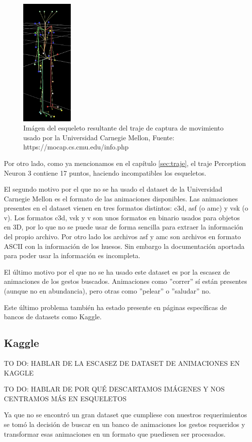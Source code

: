 \begin{figure}[H]
    \centering
    \includegraphics[width=0.23\textwidth]{Imagenes/Bitmap/MCUEsqueleto.jpg}
    \caption{Imágen del esqueleto resultante del traje de captura de movimiento usado por la Universidad Carnegie Mellon, Fuente: https://mocap.cs.cmu.edu/info.php}
    \label{fig:MCUEsqueleto}
\end{figure}

Por otro lado, como ya mencionamos en el capítulo \ref{sec:traje}, el traje Perception Neuron 3 contiene 17 puntos, haciendo incompatibles los esqueletos.

El segundo motivo por el que no se ha usado el dataset de la Universidad Carnegie Mellon es el formato de las animaciones disponibles.
Las animaciones presentes en el dataset vienen en tres formatos distintos: c3d, asf (o amc) y vsk (o v).
Los formatos c3d, vsk y v son unos formatos en binario usados para objetos en 3D, por lo que no se puede usar de forma sencilla para extraer la información del propio archivo.
Por otro lado los archivos asf y amc son archivos en formato ASCII con la información de los huesos. Sin embargo la documentación aportada para poder usar la información es incompleta.

El último motivo por el que no se ha usado este dataset es por la escasez de animaciones de los gestos buscados.
Animaciones como ''correr'' sí están presentes (aunque no en abundancia), pero otras como ''pelear'' o ''saludar'' no.

Este último problema también ha estado presente en páginas específicas de bancos de datasets como Kaggle.

\subsection{Kaggle}

TO DO: HABLAR DE LA ESCASEZ DE DATASET DE ANIMACIONES EN KAGGLE

TO DO: HABLAR DE POR QUÉ DESCARTAMOS IMÁGENES Y NOS CENTRAMOS MÁS EN ESQUELETOS

Ya que no se encontró un gran dataset que cumpliese con nuestros requerimientos se tomó la decisión de buscar en un banco de animaciones los gestos requeridos y transformar esas animaciones en un formato que puediesen ser procesados.